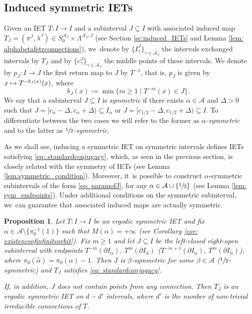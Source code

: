 \documentclass[JEP,XML,SOM,Unicode,NoEqCountersInSection,NoFloatCountersInSection,published]{cedram}
\newcommand\mto{\mathchoice{\longmapsto}{\mapsto}{\mapsto}{\mapsto}}
\theoremstyle{plain}
\newtheorem{proposition}[theorem]{Proposition}
\theoremstyle{definition}
\newcommand{\A}{\mathcal{A}}
\begin{document}
\subsection{Induced symmetric IETs}
Given an IET $T: I \to I$ and a subinterval $J \subseteq I$ with associated induced map $T_J = (\pi^J, \lambda^J) \in S_0^{\A_J} \times \Lambda^{\A_J, J}$ (see Section \ref{sc:induced_IETs} and Lemma \ref{lem: alphabetafetrconnections}), we~denote by $\{I^J_\gamma\}_{\gamma \in \A_J}$ the intervals exchanged intervals by $T_J$ and by $\{c^J_\gamma\}_{\gamma \in \A_J}$ the middle points of these intervals. We denote by $p_J : I \to J$ the first return map to $J$ by $T^{-1}$, that is, $p_J$ is given by $x \mto T^{-b_J(x)}(x)$, where
\begin{equation}
\label{eq:backward_return}
b_J(x) := \min\{m \geq 1 \mid T^{-m}(x) \in J\}.
\end{equation}
We say that a subinterval $J \subseteq I$ is \emph{symmetric} if there exists $\alpha \in \A$ and $\Delta > 0$ such that $J = [c_\alpha - \Delta, c_\alpha + \Delta) \subseteq I_\alpha$ or $J=\big[c_{1/2}-\Delta, c_{1/2} +\Delta\big)\subseteq I$. To differentiate between the two cases we will refer to the former as \emph{$\alpha$-symmetric} and to the latter as \emph{$\sfrac{1}{2}$-symmetric}.

As we shall see, inducing a symmetric IET on symmetric intervals defines IETs satisfying \eqref{eq: standardconjugacy}, which, as seen in the previous section, is closely related with the symmetry of IETs (see Lemma \ref{lem:symmetric_condition}). Moreover, it~is possible to construct $\alpha$-symmetric subintervals of the form \eqref{eq: paramofJ}, for any $\alpha \in \A \cup \{\sfrac{1}{2}\}$ (see Lemma \ref{lem: sym_endpoints}). Under additional conditions on the symmetric subinterval, we~can guarantee that associated induced maps are actually symmetric.

\begin{proposition}
\label{prop:induced_symmetric}
Let $T: I \to I$ be an ergodic symmetric IET and fix $\alpha \in \A \setminus \{\pi_0^{-1}(1)\}$ such that $M(\alpha) = +\infty$ (see Corollary \ref{cor: existenceofinfiniteorbit}). Fix $m \geq 1$ and let $J \subseteq I$ be the left-closed right-open subinterval with endpoints $T^{-m}(\partial I_\alpha)$, $T^{m}(\partial I_{\hat \alpha})$ (\resp $T^{-m + 1}(\partial I_\alpha)$, $T^{m}(\partial I_{\hat \alpha})$), where $\pi_0(\hat \alpha) = \pi_0(\alpha) - 1$.
Then $J$ is $\beta$-symmetric for some $\beta \in \A$ (\resp $\sfrac{1}{2}$-symmetric) and $T_J$ satisfies \eqref{eq: standardconjugacy}.

If, in addition, $J$ does not contain points from any connection. Then $T_J$ is an ergodic symmetric IET on $d - d'$ intervals, where $d'$ is the number of non-trivial {irreducible} connections of $T$.
\end{proposition}
\end{document}
